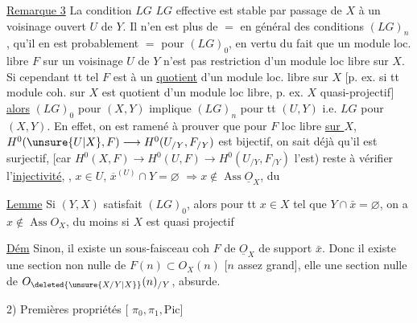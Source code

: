 \uline{Remarque 3} La condition $LG$  $LG$ effective est stable par passage de $X$ à un voisinage ouvert $U$ de $Y$. Il n'en est plus de $=$ en général des conditions $(LG)_n$,  qu'il en est \deleted{\unsure{encore} ainsi de $(LF)_0$, [et d'ailleurs} probablement  $=$ pour $(LG)_0$, en vertu du fait que un module loc. libre $F$ sur un voisinage $U$ de $Y$ n'est pas restriction d'un module loc libre sur  $X$. Si cependant tt tel $F$ est  à un \uline{quotient} d'un module loc. libre sur $X$ [p. ex. si tt module coh. sur $X$ est quotient d'un module loc libre, p. ex. $X$ quasi-projectif] \uline{alors} $(LG)_0$ pour $(X,Y)$ implique $(LG)_n$ pour tt $(U,Y)$ i.e. $LG$ pour $(X,Y)$. En effet, on est ramené à prouver que pour $F$ loc libre \uline{sur $X$}, $H^0(\unsure{U|X},F)\longrightarrow H^0(U_{/Y},F_{/Y})$ est bijectif, on sait déjà qu'il est surjectif, [car $H^0(X,F)\longrightarrow H^0(U,F)\longrightarrow H^0(U_{/Y},F_{/Y})$ l'est) reste à vérifier l'\uline{injectivité}, ,  
$x\in U$, $\overline{x}^{(U)}\cap Y=\varnothing$ $\Longrightarrow x\notin\operatorname{Ass}\underline{O}_X$,  du

\uline{Lemme} Si $(Y,X)$ satisfait $(LG)_0$, alors pour tt $x\in X$ tel que $Y\cap\bar x=\varnothing$, on a $x\notin\operatorname{Ass}O_X$, du moins si $X$ est quasi projectif

\uline{Dém} Sinon, il existe un sous-faisceau coh $F$  de $\underline{O}_X$  de support $\bar x$. Donc il existe une section non nulle de $F(n)\subset O_X(n)$ [$n$ assez grand],   elle  une section nulle de $O_{\deleted{\unsure{X/Y|X}}}(n)_{/Y}$, absurde.

2) Premières propriétés [ $\pi_0,\pi_1,\mathrm{Pic}$]

